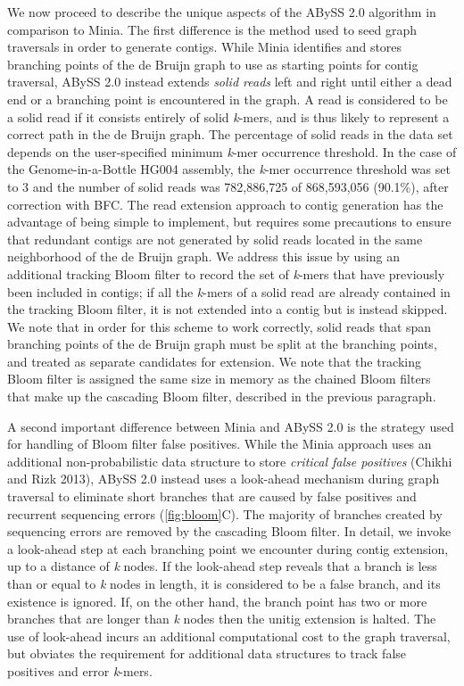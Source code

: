 \documentclass[
  12pt,
  oneside,
  openany]{book}
\begin{document}
We now proceed to describe the unique aspects of the ABySS 2.0 algorithm in comparison to Minia. The first difference is the method used to seed graph traversals in order to generate contigs. While Minia identifies and stores branching points of the de Bruijn graph to use as starting points for contig traversal, ABySS 2.0 instead extends \emph{solid reads} left and right until either a dead end or a branching point is encountered in the graph. A read is considered to be a solid read if it consists entirely of solid \emph{k}-mers, and is thus likely to represent a correct path in the de Bruijn graph. The percentage of solid reads in the data set depends on the user-specified minimum \emph{k}-mer occurrence threshold. In the case of the Genome-in-a-Bottle HG004 assembly, the \emph{k}-mer occurrence threshold was set to 3 and the number of solid reads was 782,886,725 of 868,593,056 (90.1\%), after correction with BFC. The read extension approach to contig generation has the advantage of being simple to implement, but requires some precautions to ensure that redundant contigs are not generated by solid reads located in the same neighborhood of the de Bruijn graph. We address this issue by using an additional tracking Bloom filter to record the set of \emph{k}-mers that have previously been included in contigs; if all the \emph{k}-mers of a solid read are already contained in the tracking Bloom filter, it is not extended into a contig but is instead skipped. We note that in order for this scheme to work correctly, solid reads that span branching points of the de Bruijn graph must be split at the branching points, and treated as separate candidates for extension. We note that the tracking Bloom filter is assigned the same size in memory as the chained Bloom filters that make up the cascading Bloom filter, described in the previous paragraph.

A second important difference between Minia and ABySS 2.0 is the strategy used for handling of Bloom filter false positives. While the Minia approach uses an additional non-probabilistic data structure to store \emph{critical false positives} (Chikhi and Rizk 2013), ABySS 2.0 instead uses a look-ahead mechanism during graph traversal to eliminate short branches that are caused by false positives and recurrent sequencing errors (\cref{fig:bloom}C). The majority of branches created by sequencing errors are removed by the cascading Bloom filter. In detail, we invoke a look-ahead step at each branching point we encounter during contig extension, up to a distance of \emph{k} nodes. If the look-ahead step reveals that a branch is less than or equal to \emph{k} nodes in length, it is considered to be a false branch, and its existence is ignored. If, on the other hand, the branch point has two or more branches that are longer than \emph{k} nodes then the unitig extension is halted. The use of look-ahead incurs an additional computational cost to the graph traversal, but obviates the requirement for additional data structures to track false positives and error \emph{k}-mers.
\end{document}
